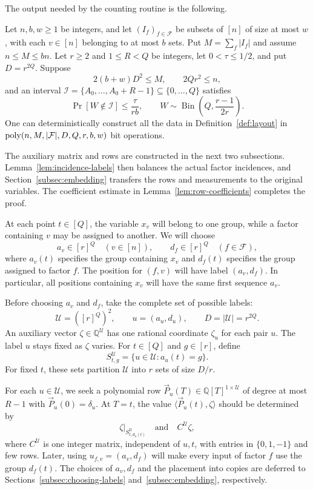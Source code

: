 The output needed by the counting routine is the following.

\begin{lemma}\label{lem:layout}
Let $n,b,w\ge1$ be integers, and let $(I_f)_{f\in\mathcal F}$ be
subsets of $[n]$ of size at most $w$,
with each $v\in[n]$ belonging to at most $b$ sets. Put
$M=\sum_f|I_f|$ and assume $n\le M\le bn$. Let $r\ge2$ and
$1\le R<Q$ be integers, let $0<\tau\le1/2$, and put $D=r^{2Q}$.
Suppose
\[
 2(b+w)D^2\le M,\qquad 2Qr^2\le n,
\]
and an interval
$\mathcal I=\{A_0,\ldots,A_0+R-1\}\subseteq\{0,\ldots,Q\}$ satisfies
\[
 \Pr[W\notin\mathcal I]\le\frac{\tau}{rb},\qquad
 W\sim\operatorname{Bin}\!\left(Q,\frac{r-1}{2r}\right).
\]
One can deterministically construct all the data in
Definition~\ref{def:layout} in
$\operatorname{poly}(n,M,|\mathcal F|,D,Q,r,b,w)$ bit operations.
\end{lemma}
The auxiliary matrix and rows are constructed in the next two
subsections. Lemma~\ref{lem:incidence-labels} then balances the actual
factor incidences, and Section~\ref{subsec:embedding} transfers the
rows and measurements to the original variables. The coefficient
estimate in Lemma~\ref{lem:row-coefficients} completes the proof.

At each point $t\in[Q]$, the variable $x_v$ will belong to one group,
while a factor containing $v$ may be assigned to another. We will choose
\[
 a_v\in[r]^Q\quad(v\in[n]),\qquad
 d_f\in[r]^Q\quad(f\in\mathcal F),
\]
where $a_v(t)$ specifies the group containing $x_v$ and $d_f(t)$
specifies the group assigned to factor $f$. The position for $(f,v)$
will have label $(a_v,d_f)$. In particular, all positions containing
$x_v$ will have the same first sequence $a_v$.

Before choosing $a_v$ and $d_f$, take the complete set of possible labels:
\begin{equation}\label{eq:auxiliary-labels}
 \mathcal U=([r]^Q)^2,\qquad u=(a_u,d_u),\qquad D=|\mathcal U|=r^{2Q}.
\end{equation}
An auxiliary vector $\zeta\in\mathbb Q^{\mathcal U}$ has one rational
coordinate $\zeta_u$ for each pair $u$. The label $u$ stays fixed as
$\zeta$ varies. For $t\in[Q]$ and $g\in[r]$, define
\begin{equation}\label{eq:auxiliary-groups}
 S^{\mathcal U}_{t,g}=\{u\in\mathcal U:a_u(t)=g\}.
\end{equation}
For fixed $t$, these sets partition $\mathcal U$ into $r$ sets of size
$D/r$.

For each $u\in\mathcal U$, we seek a polynomial row
$\vec{P}_u(T)\in\mathbb Q[T]^{1\times\mathcal U}$ of degree at most $R-1$
with $\vec{P}_u(0)=\delta_u$. At $T=t$, the value $\langle \vec{P}_u(t), \zeta\rangle$ should be
determined by
\[
 \zeta|_{S^{\mathcal U}_{t,d_u(t)}}
 \quad\text{and}\quad C^{\mathcal U}\zeta,
\]
where $C^{\mathcal U}$ is one integer matrix, independent of $u,t$,
with entries in $\{0,1,-1\}$ and few rows. Later, using
$u_{f,v}=(a_v,d_f)$ will make every input of factor $f$ use the group
$d_f(t)$. The choices of $a_v,d_f$ and the placement into copies are
deferred to Sections~\ref{subsec:choosing-labels}
and~\ref{subsec:embedding}, respectively.

